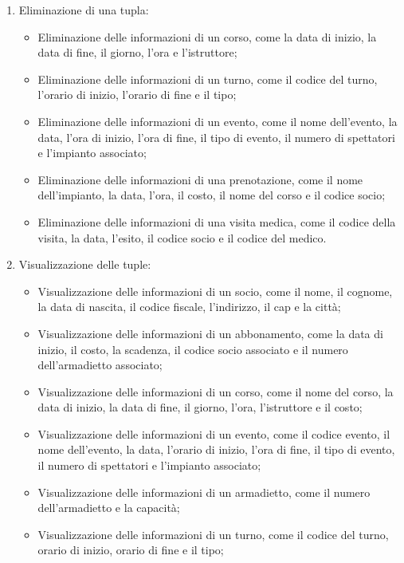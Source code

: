 \documentclass{article}
\begin{document}
\begin{flushleft}
\begin{enumerate}
            \item Eliminazione di una tupla: \\
            \begin{itemize}
                \item Eliminazione delle informazioni di un corso, come la data di inizio, la data di fine, il giorno, l'ora e l'istruttore;
                \item Eliminazione delle informazioni di un turno, come il codice del turno, l'orario di inizio, l'orario di fine e il tipo;
                \item Eliminazione delle informazioni di un evento, come il nome dell'evento, la data, l'ora di inizio, l'ora di fine, il tipo di evento, il numero di spettatori e l'impianto associato;
                \item Eliminazione delle informazioni di una prenotazione, come il nome dell'impianto, la data, l'ora, il costo, il nome del corso e il codice socio;
                \item Eliminazione delle informazioni di una visita medica, come il codice della visita, la data, l'esito, il codice socio e il codice del medico.
            \end{itemize}
            \item Visualizzazione delle tuple: \\
            \begin{itemize}
                \item Visualizzazione delle informazioni di un socio, come il nome, il cognome, la data di nascita, il codice fiscale, l'indirizzo, il cap e la città;
                \item Visualizzazione delle informazioni di un abbonamento, come la data di inizio, il costo, la scadenza, il codice socio associato e il numero dell'armadietto associato;
                \item Visualizzazione delle informazioni di un corso, come il nome del corso, la data di inizio, la data di fine, il giorno, l'ora, l'istruttore e il costo;
                \item Visualizzazione delle informazioni di un evento, come il codice evento, il nome dell'evento, la data, l'orario di inizio, l'ora di fine, il tipo di evento, il numero di spettatori e l'impianto associato;
                \item Visualizzazione delle informazioni di un armadietto, come il numero dell'armadietto e la capacità;
                \item Visualizzazione delle informazioni di un turno, come il codice del turno, orario di inizio, orario di fine e il tipo;

\end{itemize}
\end{enumerate}
\end{flushleft}
\end{document}

